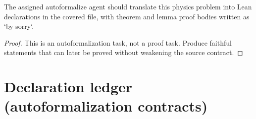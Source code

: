 \begin{theorem}
\label{thm:physics:IPhO_2026_1_B_2:target}
The assigned autoformalize agent should translate this physics problem into Lean declarations in the covered file, with theorem and lemma proof bodies written as `by sorry`.
\end{theorem}
\begin{proof}
This is an autoformalization task, not a proof task. Produce faithful statements that can later be proved without weakening the source contract.
\end{proof}


\section*{Declaration ledger (autoformalization contracts)}

